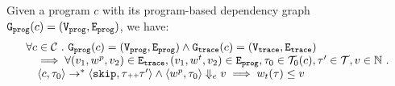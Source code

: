 \begin{thm}
    \label{thm:edgeweight_soundness}
  Given a program ${c}$ with its program-based dependency graph 
  $\mathtt{{G_{prog}}}(c) = (\mathtt{{V_{prog}}}, \mathtt{{E_{prog}}})$,
  we have:
    \[
		\begin{array}{l}
			\forall c \in \mathcal{C} 
			 ~.~   
			 \mathtt{{G_{prog}}}({c}) = (\mathtt{{V_{prog}}}, \mathtt{{E_{prog}}})
			\land 
			\mathtt{{G_{trace}}}({c}) = (\mathtt{{V_{trace}}}, \mathtt{{E_{trace}}})
			\\ \quad
			\implies
			\forall (v_1, w^p, v_2) \in \mathtt{{E_{trace}}},
			(v_1, w^t, v_2) \in \mathtt{{E_{prog}}}, 
			\mathtt{\tau}_0 \in \mathcal{T}_0(c), 
			\mathtt{\tau}' \in \mathcal{T}, v \in \mathbb{N} ~.~  
			\\ \quad
			\langle {c}, \mathtt{\tau}_0 \rangle \to^{*} \langle \mathtt{skip}, \mathtt{\tau}{\scriptscriptstyle ++}\mathtt{\tau}' \rangle 
			\land 
			\langle w^{p}, \mathtt{\tau}_0 \rangle \Downarrow_e v
			\implies
			w_{t}(\mathtt{\tau}) \leq v
		\end{array}
		\]
  \end{thm}
%
